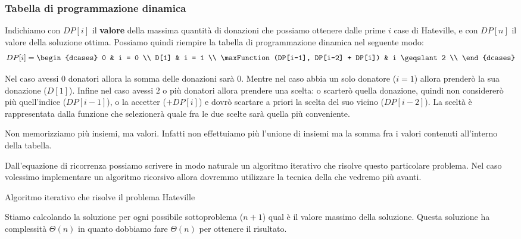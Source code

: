 \subsubsection{Tabella di programmazione dinamica}

Indichiamo con \(DP[i]\) il \textbf{valore} della  massima quantità di donazioni che possiamo ottenere dalle prime \(i\) case di Hateville, e con \(DP[n]\) il valore della soluzione ottima.
%
Possiamo quindi riempire la tabella di programmazione dinamica nel seguente modo:
\[
    DP[i] =
    \begin{dcases}
        0                                  & i = 0 \\
        D[1]                               & i = 1 \\
    \maxFunction(DP[i-1], DP[i-2] + DP[i]) & i \geqslant 2 \\
    \end{dcases}
\]

Nel caso avessi \(0\) donatori allora la somma delle donazioni sarà \(0\).
Mentre nel caso abbia un solo donatore (\(i=1\)) allora prenderò la sua donazione (\(D[1]\)).
Infine nel caso avessi \(2\) o più donatori allora prendere una scelta: o scarterò quella donazione, quindi non considererò più quell'indice (\(DP[i-1]\)), o la accetter (\(+ DP[i]\)) e dovrò scartare a priori la scelta del suo vicino (\(DP[i-2]\)).
La sceltà è rappresentata dalla funzione \maxFunction che selezionerà quale fra le due scelte sarà quella più conveniente.

\begin{note}
Non memorizziamo più insiemi, ma valori.
Infatti non effettuiamo più l'unione di insiemi ma la somma fra i valori contenuti all'interno della tabella.
\end{note}

Dall'equazione di ricorrenza possiamo scrivere in modo naturale un algoritmo iterativo che risolve questo particolare problema.
Nel caso volessimo implementare un algoritmo ricorsivo allora dovremmo utilizzare la tecnica della  che vedremo più avanti.

\begin{algorithm}[H]
    \caption{Algoritmo iterativo che risolve il problema Hateville}
    
\end{algorithm}

Stiamo calcolando la soluzione per ogni possibile sottoproblema (\(n+1\)) qual è il valore massimo della soluzione.
Questa soluzione ha complessità \(\Theta(n)\) in quanto dobbiamo fare \(\Theta(n)\) per ottenere il risultato.

